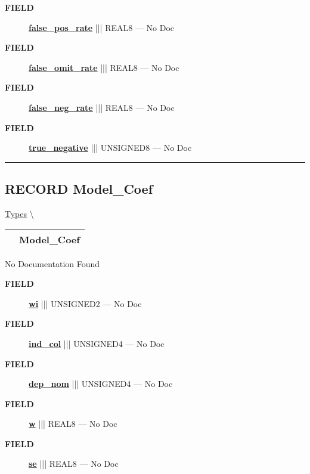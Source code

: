 \begin{description}
\item [\colorbox{tagtype}{\color{white} \textbf{\textsf{FIELD}}}] \textbf{\underline{false\_pos\_rate}} ||| REAL8 --- No Doc
\item [\colorbox{tagtype}{\color{white} \textbf{\textsf{FIELD}}}] \textbf{\underline{false\_omit\_rate}} ||| REAL8 --- No Doc
\item [\colorbox{tagtype}{\color{white} \textbf{\textsf{FIELD}}}] \textbf{\underline{false\_neg\_rate}} ||| REAL8 --- No Doc
\item [\colorbox{tagtype}{\color{white} \textbf{\textsf{FIELD}}}] \textbf{\underline{true\_negative}} ||| UNSIGNED8 --- No Doc
\end{description}





\rule{\linewidth}{0.5pt}
\subsection*{\textsf{\colorbox{headtoc}{\color{white} RECORD}
Model\_Coef}}

\hypertarget{ecldoc:logisticregression.types.model_coef}{}
\hspace{0pt} \hyperlink{ecldoc:LogisticRegression.Types}{Types} \textbackslash 

{\renewcommand{\arraystretch}{1.5}
\begin{tabularx}{\textwidth}{|>{\raggedright\arraybackslash}l|X|}
\hline
\hspace{0pt}\mytexttt{\color{red} } & \textbf{Model\_Coef} \\
\hline
\end{tabularx}
}

\par





No Documentation Found







\par
\begin{description}
\item [\colorbox{tagtype}{\color{white} \textbf{\textsf{FIELD}}}] \textbf{\underline{wi}} ||| UNSIGNED2 --- No Doc
\item [\colorbox{tagtype}{\color{white} \textbf{\textsf{FIELD}}}] \textbf{\underline{ind\_col}} ||| UNSIGNED4 --- No Doc
\item [\colorbox{tagtype}{\color{white} \textbf{\textsf{FIELD}}}] \textbf{\underline{dep\_nom}} ||| UNSIGNED4 --- No Doc
\item [\colorbox{tagtype}{\color{white} \textbf{\textsf{FIELD}}}] \textbf{\underline{w}} ||| REAL8 --- No Doc
\item [\colorbox{tagtype}{\color{white} \textbf{\textsf{FIELD}}}] \textbf{\underline{se}} ||| REAL8 --- No Doc
\end{description}





